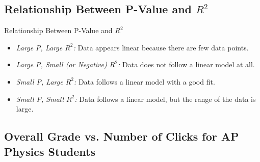 \documentclass[xcolor=x11names,compress]{beamer}
\begin{document}
\subsection{Relationship Between P-Value and $R^2$}

\begin{frame}{Relationship Between P-Value and $R^2$}
	\begin{itemize}
		\item \textit{Large P, Large $R^2$:}\newline
		Data appears linear because there are few data points.
		\vspace{2mm}
		\item \textit{Large P, Small (or Negative) $R^2$:}\newline
		Data does not follow a linear model at all.
		\vspace{2mm}
		\item \textit{Small P, Large $R^2$:}\newline
		Data follows a linear model with a good fit.
		\vspace{2mm}
		\item \textit{Small P, Small $R^2$:}\newline
		Data follows a linear model, but the range of the data is large.
	\end{itemize}
\end{frame}

\subsection{Overall Grade vs. Number of Clicks for AP Physics Students}
\end{document}
